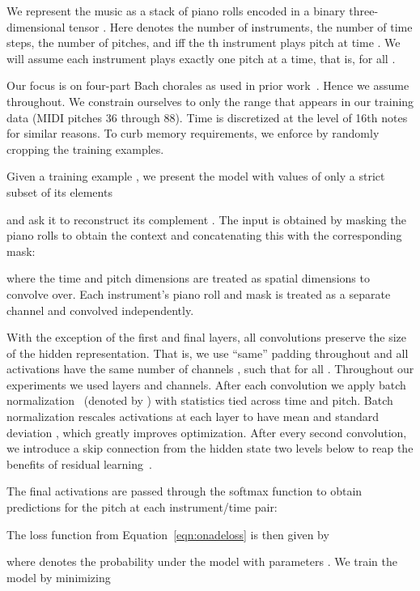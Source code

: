 \documentclass{article}
\begin{document}
We represent the music as a stack of piano rolls encoded in a binary three-dimensional tensor .
Here  denotes the number of instruments,  the number of time steps,  the number of pitches,
and  iff the th instrument plays pitch  at time .
We will assume each instrument plays exactly one pitch at a time, that is,  for all .

Our focus is on four-part Bach chorales as used in prior work~\cite{allan2005harmonising,boulanger2012modeling,goel2014polyphonic,liang2016bachbot,hadjeres2016style}.
Hence we assume  throughout.
We constrain ourselves to only the range that appears in our training data (MIDI pitches 36 through 88).
Time is discretized at the level of 16th notes for similar reasons.
To curb memory requirements, we enforce  by randomly cropping the training examples.


Given a training example ,
we present the model with values of only a strict subset of its elements

and ask it to reconstruct its complement .
The input  is obtained by masking the piano rolls 
to obtain the context 
and concatenating this with the corresponding mask:


where the time and pitch dimensions are treated as spatial dimensions to convolve over. Each instrument's piano roll  and mask  is treated as a separate channel and convolved independently.


With the exception of the first and final layers, all convolutions preserve the size of the hidden representation.
That is, we use ``same'' padding throughout and all activations have the same number of channels , such that   for all .
Throughout our experiments we used  layers and  channels.
After each convolution we apply batch normalization~\cite{ioffe2015batch} (denoted by ) with statistics tied across time and pitch.
Batch normalization rescales activations at each layer to have mean  and standard deviation , which greatly improves optimization.
After every second convolution, we introduce a skip connection from the hidden state two levels below to reap the benefits of residual learning~\cite{he2015deep}.

The final activations  are passed through the softmax function to obtain predictions for the pitch at each instrument/time pair:

The loss function from Equation~\ref{eqn:onadeloss} is then given by

where  denotes the probability under the model with parameters
.  
We train the model by minimizing
\end{document}
